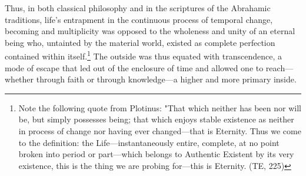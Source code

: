 Thus, in both classical philosophy and in the scriptures of the
Abrahamic traditions, life's entrapment in the continuous process of temporal change, becoming and multiplicity was opposed to the wholeness and unity of an eternal being who, untainted by the material world, existed as complete perfection contained within itself.\footnote{Note the following quote from Plotinus: "That which neither has been nor will be, but simply possesses being; that which enjoys stable existence as neither in process of change nor having ever changed---that is Eternity. Thus we come to the definition: the Life---instantaneously entire, complete, at no point broken into period or part---which belongs to Authentic Existent by its very existence, this is the thing we are probing for---this is Eternity. (TE, 225) } The outside was thus equated with transcendence, a mode of escape that led out of the enclosure of time and allowed one to reach---whether through faith or through knowledge---a higher and more primary inside.


